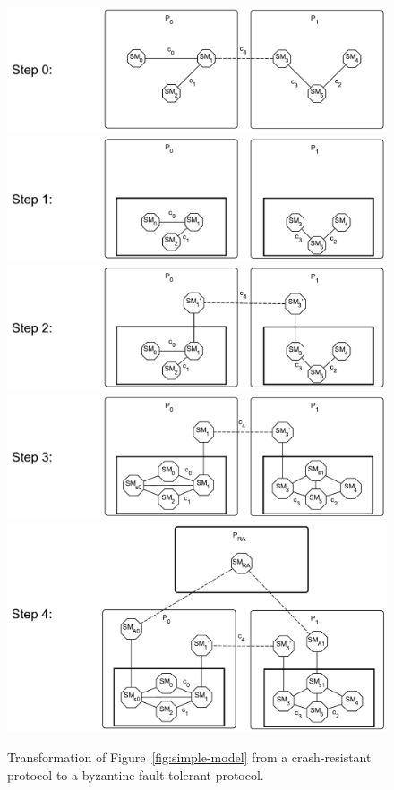 \documentclass{article}
\begin{document}
	\FloatBarrier
	\begin{figure}
		\center
		\includegraphics[scale=0.40]{figures/state-machines/distributed-protocol-model-transformation0.pdf}
		\includegraphics[scale=0.40]{figures/state-machines/distributed-protocol-model-transformation1.pdf}
		\includegraphics[scale=0.40]{figures/state-machines/distributed-protocol-model-transformation2.pdf}
		\includegraphics[scale=0.40]{figures/state-machines/distributed-protocol-model-transformation3.pdf}
		\includegraphics[scale=0.40]{figures/state-machines/distributed-protocol-model-transformation4.pdf}
		\caption{Transformation of Figure~\ref{fig:simple-model} from a crash-resistant protocol to a byzantine fault-tolerant protocol.}
		\label{fig:tranformation-model}
	\end{figure}
	\FloatBarrier
\end{document}
